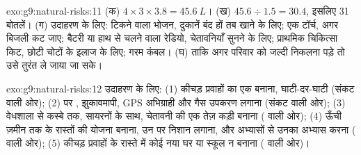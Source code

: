 \begin{solution}{exo:g9:natural-risks:11}
(क) $4 \times 3 \times 3.8 = \qty{45.6}{L}$। (ख) $45.6 \div 1.5 = 30.4$,
इसलिए 31 बोतलें। (ग) उदाहरण के लिए: टिकने वाला भोजन, दुकानें बंद हों तब खाने के लिए; एक
टॉर्च, अगर बिजली कट जाए; बैटरी या हाथ से चलने वाला रेडियो, चेतावनियाँ सुनने के लिए;
प्राथमिक चिकित्सा किट, छोटी चोटों के इलाज के लिए; गरम कंबल। (घ) ताकि अगर परिवार को जल्दी
निकलना पड़े तो उसे तुरंत ले जाया जा सके।
\end{solution}

\begin{solution}{exo:g9:natural-risks:12}
उदाहरण के लिए: (1) कीचड़ प्रवाहों का एक  बनाना, घाटी-दर-घाटी
(संकट वाली ओर); (2)  पर , झुकावमापी, GPS अभिग्राही और गैस
उपकरण लगाना (संकट वाली ओर); (3) वेधशाला से कस्बे तक, सायरनों के साथ, चेतावनी की एक
तेज़ कड़ी बनाना ( वाली
ओर); (4) ऊँची ज़मीन तक के रास्तों की योजना बनाना, उन पर निशान लगाना, और अभ्यासों से उनका
अभ्यास करना ( वाली ओर); (5) कीचड़ प्रवाहों के रास्ते में कोई नया घर या स्कूल न
बनाना ( वाली ओर)।
\end{solution}

